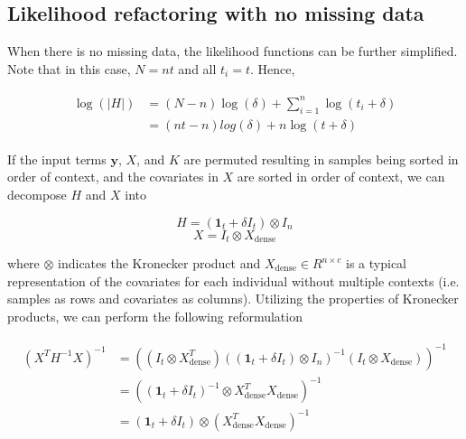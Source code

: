     \subsection{Likelihood refactoring with no missing data}
    
        When there is no missing data, the likelihood functions can be further simplified. Note that in this case, $N = nt$ and all $t_i = t$. Hence,
        
        \begin{align}
        \begin{split}
            \log{(|H|)} & = (N-n)\log{(\delta)} + \sum_{i=1}^n \log{(t_i + \delta)} \\
                        & = (nt-n)log{(\delta)} + n\log{(t + \delta)}
        \end{split}
        \end{align}
        
        If the input terms $\mathbf{y}$, $X$, and $K$ are permuted resulting in samples being sorted in order of context, and the covariates in $X$ are sorted in order of context, we can decompose $H$ and $X$ into
        
        \begin{equation}
            H = (\mathbf{1}_{t} + \delta I_t) \otimes I_n 
        \end{equation}
        \begin{equation}
            X = I_t \otimes X_{\text{dense}}
        \end{equation}
        
        \noindent where $\otimes$ indicates the Kronecker product and $X_{\text{dense}} \in R^{n \times c}$ is a typical representation of the covariates for each individual without multiple contexts (i.e. samples as rows and covariates as columns). Utilizing the properties of Kronecker products, we can perform the following reformulation

        \begin{align}
        \begin{split}
            (X^TH^{-1}X)^{-1} & = ((I_t \otimes X^T_{\text{dense}})((\mathbf{1}_{t} + \delta I_t) \otimes I_n )^{-1}(I_t \otimes X_{\text{dense}}))^{-1} \\
                              & = ((\mathbf{1}_{t} + \delta I_t)^{-1} \otimes X^T_{\text{dense}}X_{\text{dense}})^{-1} \\
                              & = (\mathbf{1}_{t} + \delta I_t) \otimes (X^T_{\text{dense}}X_{\text{dense}})^{-1}
        \end{split}
        \end{align}
        

